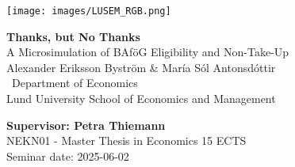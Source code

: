
\sloppy  %

\texttt{[image: images/LUSEM\_RGB.png]} %

\vspace{2cm}
\begin{center}       
    \vspace*{2cm}
    {\LARGE \textbf{Thanks, but No Thanks} \\ 
     \Large A Microsimulation of BAföG Eligibility and Non-Take-Up} \\
    \vspace{1cm}
    \large Alexander Eriksson Byström \& María Sól Antonsdóttir \\[0.3cm]\ 
    \normalsize Department of Economics \\ 
    Lund University School of Economics and Management
\end{center}
\vspace{2cm}

\vfill
\noindent 
\textbf{Supervisor: Petra Thiemann} \\ 
NEKN01 - Master Thesis in Economics 15 ECTS \\ 
Seminar date: 2025-06-02
\thispagestyle{empty}

\fussy  %

\newpage


